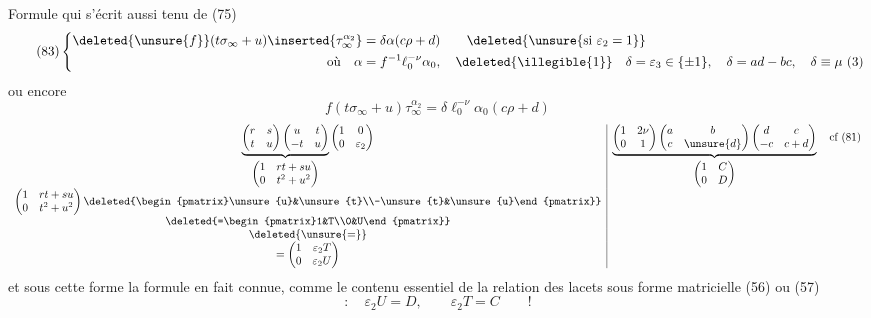 Formule qui s'écrit aussi
   tenu de (75)
\[
\tag{83}
\left\{\begin{aligned}
\deleted{\unsure{f}}(t\sigma_\infty+u)\inserted{\tau_\infty^{\alpha_2}}
&=\delta\alpha(c\rho+d)
\qquad\deleted{\unsure{\text{si }\varepsilon_2=1}}\\
\text{où}\quad\alpha&=f^{-1}\ell_0^{-\nu}\alpha_0,
\quad\deleted{\illegible{1}}\quad
\delta=\varepsilon_3\in\{\pm1\},\quad\delta=ad-bc,\quad\delta\equiv\mu\ (3)
\end{aligned}\right.
\]
ou encore
\[
\tag{84}
f(t\sigma_\infty+u)\tau_\infty^{\alpha_2}
=\delta\ell_0^{-\nu}\alpha_0(c\rho+d)
\]
\[
\begin{array}{c|c}
\underbrace{
\begin{pmatrix}r&s\\t&u\end{pmatrix}
\begin{pmatrix}u&t\\-t&u\end{pmatrix}
}_{\displaystyle\begin{pmatrix}1&rt+su\\0&t^2+u^2\end{pmatrix}}
\begin{pmatrix}1&0\\0&\varepsilon_2\end{pmatrix}
&
\underbrace{
\begin{pmatrix}1&2\nu\\0&1\end{pmatrix}
\begin{pmatrix}a&b\\c&\unsure{d}\end{pmatrix}
\begin{pmatrix}d&c\\-c&c+d\end{pmatrix}
}_{\displaystyle\begin{pmatrix}1&C\\0&D\end{pmatrix}}
\quad\text{cf (81)}\\
\begin{pmatrix}1&rt+su\\0&t^2+u^2\end{pmatrix}\deleted{\begin{pmatrix}\unsure{u}&\unsure{t}\\-\unsure{t}&\unsure{u}\end{pmatrix}}&\\
\deleted{=\begin{pmatrix}1&T\\0&U\end{pmatrix}}&\\
\deleted{\unsure{=}}&\\
=\begin{pmatrix}1&\varepsilon_2T\\0&\varepsilon_2U\end{pmatrix}&
\end{array}
\]
et sous cette forme la formule  en fait connue,
comme le contenu essentiel de la  relation des lacets sous forme matricielle (56) ou (57)
\[
:\quad\varepsilon_2U=D,\qquad\varepsilon_2T=C\qquad!
\]

